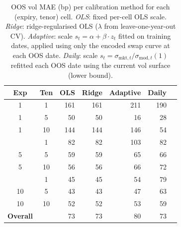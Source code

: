 \begin{table}[H]
\centering
\caption{OOS vol MAE (bp) per calibration method for each (expiry, tenor) cell. \emph{OLS}: fixed per-cell OLS scale. \emph{Ridge}: ridge-regularised OLS ($\lambda$ from leave-one-year-out CV). \emph{Adaptive}: scale $s_t = \alpha + \beta \cdot z_t$ fitted on training dates, applied using only the encoded swap curve at each OOS date. \emph{Daily}: scale $s_t = \sigma_{\mathrm{mkt},t}/\sigma_{\mathrm{mod},t}(1)$ refitted each OOS date using the current vol surface (lower bound).}
\label{tab:improved_comparison}
\begin{tabular}{@{}ccrrrrr@{}}
\toprule
\textbf{Exp} & \textbf{Ten} & \textbf{OLS} & \textbf{Ridge} & \textbf{Adaptive} & \textbf{Daily} \\
\midrule
1 & 1 & 161 & 161 & 211 & 190 \\
1 & 5 & 50 & 50 & 16 & 28 \\
1 & 10 & 144 & 144 & 146 & 54 \\
\addlinespace[2pt]
5 & 1 & 82 & 82 & 103 & 82 \\
5 & 5 & 59 & 59 & 65 & 66 \\
5 & 10 & 56 & 56 & 66 & 72 \\
\addlinespace[2pt]
10 & 1 & 45 & 45 & 54 & 79 \\
10 & 5 & 43 & 43 & 47 & 63 \\
10 & 10 & 52 & 52 & 53 & 59 \\
\midrule
\textbf{Overall} & & 73 & 73 & 80 & 73 \\
\bottomrule
\end{tabular}
\end{table}